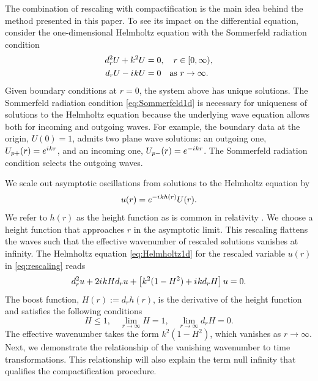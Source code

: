\documentclass[draft,onefignum,onetabnum]{siamart190516}
\newcommand{\be}{\begin{equation}}
\newcommand{\ee}{\end{equation}}
\newcommand{\iu}{{i\mkern1mu}}
\begin{document}
The combination of rescaling with compactification is the main idea behind the method presented in this paper. To see its impact on the differential equation, consider the one-dimensional Helmholtz equation with the Sommerfeld radiation condition
\begin{align}
\label {eq:Helmholtz1d} d_r^2 U + k^2 U &= 0, \quad r\in[0,\infty),\\
\label{eq:Sommerfeld1d}d_r U - \iu k U &= 0 \quad \mathrm{as} \ r\to\infty.
\end{align}
Given boundary conditions at $r=0$, the system above has unique solutions. The Sommerfeld radiation condition \eqref{eq:Sommerfeld1d} is necessary for uniqueness of solutions to the Helmholtz equation because the underlying wave equation allows both for incoming and outgoing waves. For example, the boundary data at the origin, $U(0)=1$, admits two plane wave solutions: an outgoing one, $U_{p+}(r) = e^{\iu k r}$, and an incoming one, $U_{p-}(r) = e^{-\iu k r}$. The Sommerfeld radiation condition selects the outgoing waves.

We scale out asymptotic oscillations from solutions to the Helmholtz equation by
\be\label{eq:rescaling} u(r) = e^{-\iu k h(r)} U(r).\ee
We refer to $h(r)$ as the height function as is common in relativity \cite{reinhart1973maximal, beig1996vacuum}. We  choose a height function that approaches $r$ in the asymptotic limit. This rescaling flattens the waves such that the effective wavenumber of rescaled solutions vanishes at infinity. The Helmholtz equation \eqref{eq:Helmholtz1d} for the rescaled variable $u(r)$ in \eqref{eq:rescaling} reads
\be\label{eq:resc_helm}
d_r^2 u + 2 \iu k H d_r u + \left[ k^2 (1-H^2) + \iu k d_r H\right] u = 0.
\ee
The boost function, $H(r) :=d_r h(r)$, is the derivative of the height function and satisfies the following conditions \cite{Zenginoglu08, ZengFramework, jaramillo2021pseudospectrum}
\be \label{eq:h_cond}
	H \leq 1, \quad \lim_{r\to\infty} H = 1, \quad \lim_{r\to\infty} d_r H = 0.
\ee
The effective wavenumber takes the form $k^2(1-H^2)$, which vanishes as $r\to\infty$. Next, we demonstrate the relationship of the vanishing wavenumber to time transformations. This relationship will also explain the term null infinity that qualifies the compactification procedure.
\end{document}
